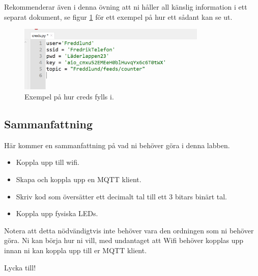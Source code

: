 \documentclass{article}
\begin{document}
Rekommenderar även i denna övning att ni håller all känslig information i ett separat dokument, se figur \ref{fig:my_label} för ett exempel på hur ett sådant kan se ut.

\begin{figure}[H]
    \centering
    \includegraphics[width=0.8\textwidth]{exempelwifi.png}
    \caption{Exempel på hur creds fylls i.}
    \label{fig:my_label}
\end{figure}
\newpage
\subsection*{Sammanfattning}
Här kommer en sammanfattning på vad ni behöver göra i denna labben.
\begin{itemize}
    \item Koppla upp till wifi.
    \item Skapa och koppla upp en MQTT klient.
    \item Skriv kod som översätter ett decimalt tal till ett 3 bitars binärt tal.
    \item Koppla upp fysiska LEDs.
\end{itemize}
Notera att detta nödvändigtvis inte behöver vara den ordningen som ni behöver göra. Ni kan börja hur ni vill, med undantaget att Wifi behöver kopplas upp innan ni kan koppla upp till er MQTT klient.

Lycka till!
\end{document}
